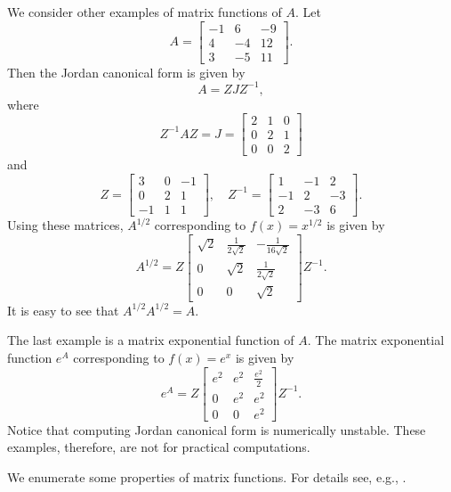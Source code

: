 \begin{Example}\label{ex:square-root-exponential-jordan}
{We consider other examples of matrix functions of $A$. Let}
\[A=\begin{bmatrix}-1&6&-9\\4&-4&12\\3&-5&11\end{bmatrix}.\]
{Then the Jordan canonical form is given by}
\[A=ZJZ^{-1},\]
{where}
\[Z^{-1}AZ=J=\begin{bmatrix}2&1&0\\0&2&1\\0&0&2\end{bmatrix}\]
{and}
\[Z=\begin{bmatrix}3&0&-1\\0&2&1\\-1&1&1\end{bmatrix},\quad Z^{-1}=\begin{bmatrix}1&-1&2\\-1&2&-3\\2&-3&6\end{bmatrix}.\]
{Using these matrices, $A^{1/2}$ corresponding to $f(x)=x^{1/2}$ is given by}
\[A^{1/2}=Z\begin{bmatrix}\sqrt{2}&\frac{1}{2\sqrt{2}}&-\frac{1}{16\sqrt{2}}\\0&\sqrt{2}&\frac{1}{2\sqrt{2}}\\0&0&\sqrt{2}\end{bmatrix}Z^{-1}.\]
{It is easy to see that $A^{1/2}A^{1/2}=A$.}

{The last example is a matrix exponential function of $A$. The matrix exponential function $e^A$ corresponding to $f(x)=e^x$ is given by}
\[e^A=Z\begin{bmatrix}e^2&e^2&\frac{e^2}{2}\\0&e^2&e^2\\0&0&e^2\end{bmatrix}Z^{-1}.\]
{Notice that computing Jordan canonical form is numerically unstable. These examples, therefore, are not for practical computations.}
\end{Example}

{We enumerate some properties of matrix functions. For details see, e.g., .}

